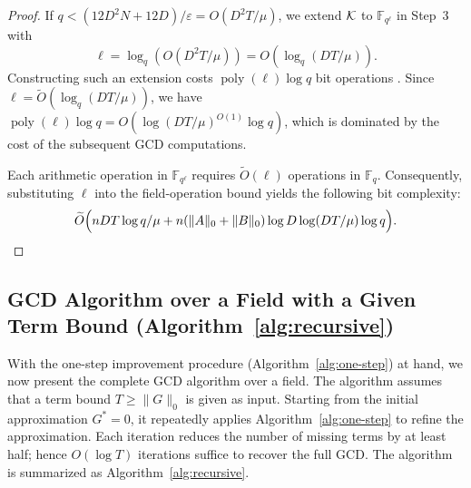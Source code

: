 \documentclass{article}
\numberwithin{equation}{section}
\begin{document}
\begin{proof}
If $q < (12D^2 N + 12D)/\varepsilon = O(D^2 T/\mu)$, we extend ${\mathcal{K}}$ to $\mathbb{F}_{q^{\ell}}$ in Step~3 with
\[
\ell = \log_q\left(O(D^2 T/\mu)\right) = O(\log_q(DT/\mu)).
\]
Constructing such an extension costs $\operatorname{poly}(\ell)\log q$ bit operations \cite{Shoup1994}. Since $\ell = \widetilde{O}(\log_q(DT/\mu))$, we have $\operatorname{poly}(\ell)\log q = O(\log(DT/\mu)^{O(1)}\log q)$, which is dominated by the cost of the subsequent GCD computations. 

Each arithmetic operation in $\mathbb{F}_{q^{\ell}}$ requires $\widetilde{O}(\ell)$ operations in $\mathbb{F}_q$. Consequently, substituting $\ell$ into the field-operation bound yields the following bit complexity:
\[
\widetilde{O}\Bigl( n D T \log q / \mu + n(\|A\|_0 + \|B\|_0) \log D \log(DT/\mu)\log q \Bigr).
\]


\end{proof}







\subsection{GCD Algorithm over a Field with a Given Term Bound  (Algorithm~\ref{alg:recursive})
\label{sec:recursive}}

With the one-step improvement procedure (Algorithm~\ref{alg:one-step}) at hand, we now present the complete GCD algorithm over a field. The algorithm assumes that a term bound $T \ge \|G\|_0$ is given as input. Starting from the initial approximation $G^* = 0$, it repeatedly applies Algorithm~\ref{alg:one-step} to refine the approximation. Each iteration reduces the number of missing terms by at least half; hence $O(\log T)$ iterations suffice to recover the full GCD. The algorithm is summarized as Algorithm~\ref{alg:recursive}.
\end{document}
